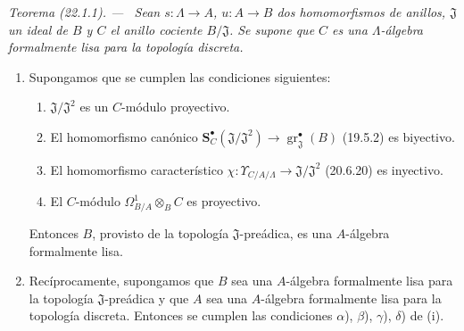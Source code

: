 \documentclass[10pt,oneside]{book}
\makeatletter
\newcommand{\setmanualcurrentlabel}[1]{\def\@currentlabel{#1}}
\newenvironment{theorem}[1][]{%
  \setmanualcurrentlabel{#1}\par\medskip\noindent\itshape Teorema (#1). ---\ }{\par}
\makeatother
\begin{document}
\begin{theorem}[22.1.1]
\label{0.22.1.1-es}
Sean $s:\Lambda\to A$, $u:A\to B$ dos homomorfismos de anillos,
$\mathfrak J$ un ideal de $B$ y $C$ el anillo cociente $B/\mathfrak J$. Se
supone que $C$ es una $\Lambda$-álgebra formalmente lisa para la topología
discreta.
\begin{enumerate}
  \item[\textup{(i)}] Supongamos que se cumplen las condiciones siguientes:
  \begin{enumerate}
    \item[\textup{$\alpha$)}] $\mathfrak J/\mathfrak J^2$ es un $C$-módulo proyectivo.
    \item[\textup{$\beta$)}] El homomorfismo canónico
    $\mathbf S_C^\bullet(\mathfrak J/\mathfrak J^2)\to
    \operatorname{gr}_{\mathfrak J}^\bullet(B)$ \textup{(19.5.2)} es biyectivo.
    \item[\textup{$\gamma$)}] El homomorfismo característico
    $\chi:\Upsilon_{C/A/\Lambda}\to\mathfrak J/\mathfrak J^2$ \textup{(20.6.20)}
    es inyectivo.
    \item[\textup{$\delta$)}] El $C$-módulo
    $\Omega^1_{B/A}\otimes_BC$ es proyectivo.
  \end{enumerate}
  Entonces $B$, provisto de la topología $\mathfrak J$-preádica, es una
  $A$-álgebra formalmente lisa.

  \item[\textup{(ii)}] Recíprocamente, supongamos que $B$ sea una $A$-álgebra
  formalmente lisa para la topología $\mathfrak J$-preádica y que $A$ sea una
  $A$-álgebra formalmente lisa para la topología discreta. Entonces se
  cumplen las condiciones \textup{$\alpha$), $\beta$), $\gamma$), $\delta$)} de \textup{(i)}.
\end{enumerate}
\end{theorem}
\end{document}
